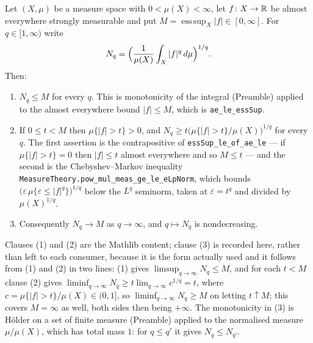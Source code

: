 \begin{proposition}
Let $(X,\mu)$ be a measure space with $0<\mu(X)<\infty$, let
$f\colon X\to\mathbb{R}$ be almost everywhere strongly measurable and put
$M=\operatorname*{ess\,sup}_X|f|\in[0,\infty]$.  For $q\in[1,\infty)$ write
\[
N_q=\Bigl(\frac1{\mu(X)}\int_X|f|^{q}\,d\mu\Bigr)^{1/q}.
\]
Then:
\begin{enumerate}
\item $N_q\le M$ for every $q$.  This is monotonicity of the integral
  (Preamble) applied to the almost everywhere bound $|f|\le M$, which is
  \texttt{ae\_le\_essSup}.
\item If $0\le t<M$ then $\mu\{|f|>t\}>0$, and
  $N_q\ge t\bigl(\mu\{|f|>t\}/\mu(X)\bigr)^{1/q}$ for every $q$.  The first
  assertion is the contrapositive of \texttt{essSup\_le\_of\_ae\_le} --- if
  $\mu\{|f|>t\}=0$ then $|f|\le t$ almost everywhere and so $M\le t$ --- and the
  second is the Chebyshev--Markov inequality
  \texttt{MeasureTheory.pow\_mul\_meas\_ge\_le\_eLpNorm}, which bounds
  $\bigl(\varepsilon\,\mu\{\varepsilon\le|f|^{q}\}\bigr)^{1/q}$ below the
  $L^{q}$ seminorm, taken at $\varepsilon=t^{q}$ and divided by
  $\mu(X)^{1/q}$.
\item Consequently $N_q\to M$ as $q\to\infty$, and $q\mapsto N_q$ is
  nondecreasing.
\end{enumerate}
Clauses (1) and (2) are the Mathlib content; clause (3) is recorded here, rather
than left to each consumer, because it is the form actually used and it follows
from (1) and (2) in two lines: (1) gives
$\limsup_{q\to\infty}N_q\le M$, and for each $t<M$ clause (2) gives
$\liminf_{q\to\infty}N_q\ge t\lim_{q\to\infty}c^{1/q}=t$, where
$c=\mu\{|f|>t\}/\mu(X)\in(0,1]$, so $\liminf_{q\to\infty}N_q\ge M$ on letting
$t\uparrow M$; this covers $M=\infty$ as well, both sides then being $+\infty$.
The monotonicity in (3) is H\"older on a set of finite measure (Preamble)
applied to the normalised measure $\mu/\mu(X)$, which has total mass $1$: for
$q\le q'$ it gives $N_q\le N_{q'}$.
\end{proposition}

